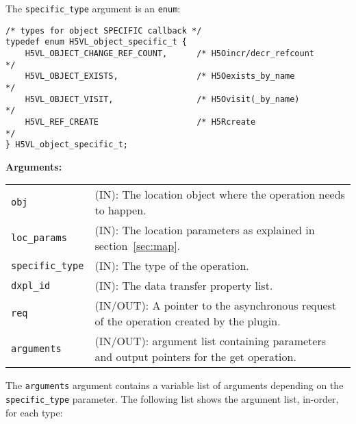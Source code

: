 The {\tt specific\_type} argument is an {\tt enum}:
\begin{lstlisting}
/* types for object SPECIFIC callback */
typedef enum H5VL_object_specific_t {
    H5VL_OBJECT_CHANGE_REF_COUNT,      /* H5Oincr/decr_refcount              */
    H5VL_OBJECT_EXISTS,                /* H5Oexists_by_name                  */
    H5VL_OBJECT_VISIT,                 /* H5Ovisit(_by_name)                 */
    H5VL_REF_CREATE                    /* H5Rcreate                          */
} H5VL_object_specific_t;
\end{lstlisting}

\textbf{Arguments:}\\
\begin{tabular}{l p{10cm}}
  {\tt obj} & (IN): The location object  where the operation needs to happen.\\
  {\tt loc\_params} & (IN): The location parameters as explained in section~\ref{sec:map}.\\
  {\tt specific\_type} & (IN): The type of the operation.\\
  {\tt dxpl\_id} & (IN): The data transfer property list.\\
  {\tt req} & (IN/OUT): A pointer to the asynchronous request of the
  operation created by the plugin.\\
  {\tt arguments} & (IN/OUT): argument list containing parameters and
  output pointers for the get operation. \\
\end{tabular}

The {\tt arguments} argument contains a variable list of arguments
depending on the {\tt specific\_type} parameter. The following list shows
the argument list, in-order, for each type:

